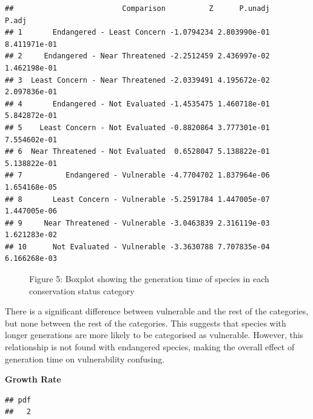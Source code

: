 \documentclass[
]{article}
\newenvironment{Shaded}{\begin{snugshade}}{\end{snugshade}}
\newcommand{\DocumentationTok}[1]{\textcolor[rgb]{0.56,0.35,0.01}{\textbf{\textit{#1}}}}
\newcommand{\FunctionTok}[1]{\textcolor[rgb]{0.13,0.29,0.53}{\textbf{#1}}}
\newcommand{\NormalTok}[1]{#1}
\newcommand{\SpecialCharTok}[1]{\textcolor[rgb]{0.81,0.36,0.00}{\textbf{#1}}}
\newcommand{\StringTok}[1]{\textcolor[rgb]{0.31,0.60,0.02}{#1}}
\begin{document}
\begin{verbatim}
##                         Comparison          Z      P.unadj        P.adj
## 1       Endangered - Least Concern -1.0794234 2.803990e-01 8.411971e-01
## 2     Endangered - Near Threatened -2.2512459 2.436997e-02 1.462198e-01
## 3  Least Concern - Near Threatened -2.0339491 4.195672e-02 2.097836e-01
## 4       Endangered - Not Evaluated -1.4535475 1.460718e-01 5.842872e-01
## 5    Least Concern - Not Evaluated -0.8820864 3.777301e-01 7.554602e-01
## 6  Near Threatened - Not Evaluated  0.6528047 5.138822e-01 5.138822e-01
## 7          Endangered - Vulnerable -4.7704702 1.837964e-06 1.654168e-05
## 8       Least Concern - Vulnerable -5.2591784 1.447005e-07 1.447005e-06
## 9     Near Threatened - Vulnerable -3.0463839 2.316119e-03 1.621283e-02
## 10      Not Evaluated - Vulnerable -3.3630788 7.707835e-04 6.166268e-03
\end{verbatim}

\begin{figure}
\centering

\caption{Figure 5: Boxplot showing the generation time of species in
each conservation status category}
\end{figure}

There is a significant difference between vulnerable and the rest of the
categories, but none between the rest of the categories. This suggests
that species with longer generations are more likely to be categorised
as vulnerable. However, this relationship is not found with endangered
species, making the overall effect of generation time on vulnerability
confusing.

\textbf{Growth Rate}

\begin{Shaded}
\end{Shaded}

\begin{verbatim}
## pdf 
##   2
\end{verbatim}
\end{document}
